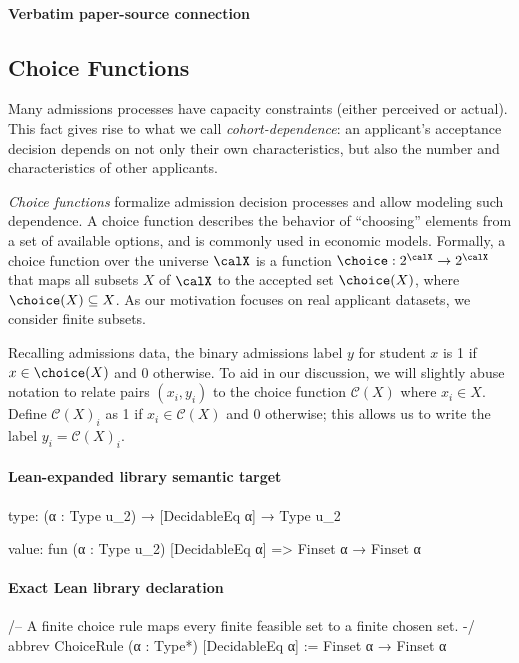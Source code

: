 \documentclass[10pt]{article}
\begin{document}
\paragraph{Verbatim paper-source connection}
\begin{ReviewVerbatim}
\subsection{Choice Functions}

Many admissions processes have capacity constraints (either perceived or actual). This fact gives rise to what we call \textit{cohort-dependence}: an applicant's acceptance decision depends on not only their own characteristics, but also the number and characteristics of other applicants.

\textit{Choice functions} formalize admission decision processes and allow modeling such dependence.
A choice function describes the behavior of ``choosing'' elements from a set of available options, and is commonly used in economic models. Formally, a choice function over the universe $\calX$ is a function $\choice: 2^\calX \to 2^\calX$ that maps all subsets $X$ of $\calX$ to the accepted set $\choice(X)$, where $\choice(X) \subseteq X$. As our motivation focuses on real applicant datasets, we consider finite subsets.

Recalling admissions data, the binary admissions label $y$ for student $x$ is 1 if $x \in \choice(X)$ and 0 otherwise.
To aid in our discussion, we will slightly abuse notation to relate pairs $(x_i,y_i)$ to the choice function $\mathcal C(X)$ where $x_i\in X$.
Define $\mathcal C(X)_i$ as 1 if $x_i\in \mathcal C(X)$ and 0 otherwise; this allows us to write the label $y_i=\mathcal C(X)_i$.
\end{ReviewVerbatim}



\paragraph{Lean-expanded library semantic target}
\begin{ReviewVerbatim}
type:
(α : Type u_2) → [DecidableEq α] → Type u_2

value:
fun (α : Type u_2) [DecidableEq α] => Finset α → Finset α
\end{ReviewVerbatim}

\paragraph{Exact Lean library declaration}
\begin{ReviewVerbatim}
/-- A finite choice rule maps every finite feasible set to a finite chosen set. -/
abbrev ChoiceRule (α : Type*) [DecidableEq α] := Finset α → Finset α
\end{ReviewVerbatim}
\end{document}
